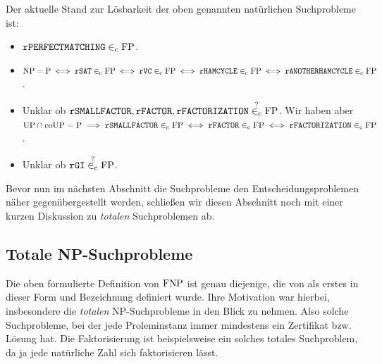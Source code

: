 Der aktuelle Stand zur Lösbarkeit der oben genannten natürlichen Suchprobleme ist:\label{label:lösbarkeit}
\begin{itemize}\raggedright
    \item $\mathtt{rPERFECTMATCHING}\in_\mathrm{c}\mathrm{FP}$.
    \item $\mathrm{NP}=\mathrm{P} \iff \mathtt{rSAT}\in_\mathrm{c}\mathrm{FP} \iff \mathtt{rVC}\in_\mathrm{c}\mathrm{FP} \iff \mathtt{rHAMCYCLE}\in_\mathrm{c}\mathrm{FP} \iff \mathtt{rANOTHERHAMCYCLE}\in_\mathrm{c}\mathrm{FP}$.
    \item Unklar ob $\mathtt{rSMALLFACTOR}, \mathtt{rFACTOR}, \mathtt{rFACTORIZATION}\stackrel{?}{\in_\mathrm{c}}\mathrm{FP}$. Wir haben aber $\mathrm{UP}\cap\mathrm{coUP}=\mathrm{P} \implies \mathtt{rSMALLFACTOR}\in_\mathrm{c} \mathrm{FP} \iff \mathtt{rFACTOR}\in_\mathrm{c}\mathrm{FP} \iff \mathtt{rFACTORIZATION}\in_\mathrm{c}\mathrm{FP}$.
    \item Unklar ob $\mathtt{rGI}\stackrel{?}{\in_\mathrm{c}}{\mathrm{FP}}$.
\end{itemize}

Bevor nun im nächsten Abschnitt die Suchprobleme den Entscheidungsproblemen näher gegenübergestellt werden, schließen wir diesen Abschnitt noch mit einer kurzen Diskussion zu \emph{totalen} Suchproblemen ab.

\subsection*{Totale NP-Suchprobleme}

Die oben formulierte Definition von $\mathrm{FNP}$ ist genau diejenige, die von \textcite{megiddo_total_1991} als erstes in dieser Form und Bezeichnung definiert wurde. Ihre Motivation war hierbei, insbesondere die \emph{totalen} NP-Suchprobleme in den Blick zu nehmen. Also solche Suchprobleme, bei der jede Proleminstanz immer mindestens ein Zertifikat bzw. Lösung hat. Die Faktorisierung ist beispielsweise ein solches totales Suchproblem, da ja jede natürliche Zahl sich faktorisieren lässt.


